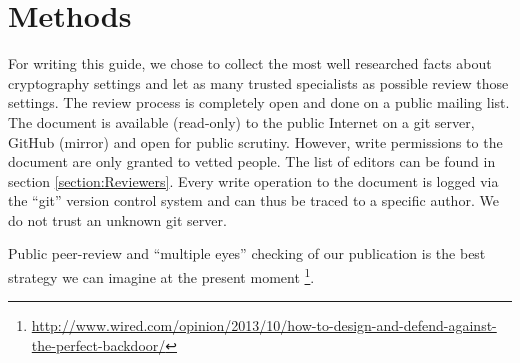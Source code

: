 \section{Methods}
\label{section:Methods}

For writing this guide, we chose to collect the most well researched facts about 
cryptography settings and let as many trusted specialists as possible review those settings.  
The review process is completely open and done on a public mailing list. The
document is available (read-only) to the public Internet on a git server, GitHub (mirror) 
and open for public scrutiny. However, write permissions to the document are only
granted to vetted people. The list of editors can be found in section \ref{section:Reviewers}.  
Every write operation to the document is logged via the ``git'' version control system 
and can thus be traced to a specific author.  We do not trust an unknown git server. 

Public peer-review and ``multiple eyes'' checking of our publication is the best
strategy we can imagine at the present moment
\footnote{\url{http://www.wired.com/opinion/2013/10/how-to-design-and-defend-against-the-perfect-backdoor/}}.

